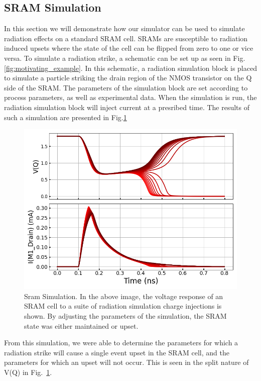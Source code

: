 \documentclass[conference]{IEEEtran}
\begin{document}
    \subsection{SRAM Simulation}\label{subsec:sram_sim}
    In this section we will demonstrate how our simulator can be used to simulate radiation effects on a standard SRAM cell. SRAMs are susceptible to radiation induced upsets where the state of the cell can be flipped from zero to one or vice versa. To simulate a radiation strike, a schematic can be set up as seen in Fig. \ref{fig:motivating_example}. In this schematic, a radiation simulation block is placed to simulate a particle striking the drain region of the NMOS transistor on the Q side of the SRAM. The parameters of the simulation block are set according to process parameters, as well as experimental data. When the simulation is run, the radiation simulation block will inject current at a presribed time. The results of such a simulation are presented in Fig.\ref{fig:motivating_example_result}
    
    
    
    \begin{figure}[htbp]
        \centering
        \includegraphics[width=0.95\linewidth]{SRAM_Response_Multi}
        \caption{Sram Simulation. In the above image, the voltage response of an SRAM cell to a suite of radiation simulation charge injections is shown. By adjusting the parameters of the simulation, the SRAM state was either maintained or upset.}
        \label{fig:motivating_example_result}
    \end{figure}

	From this simulation, we were able to determine the parameters for which a radiation strike will cause a single event upset in the SRAM cell, and the parameters for which an upset will not occur. This is seen in the split nature of V(Q) in Fig.~\ref{fig:motivating_example_result}.
\end{document}

